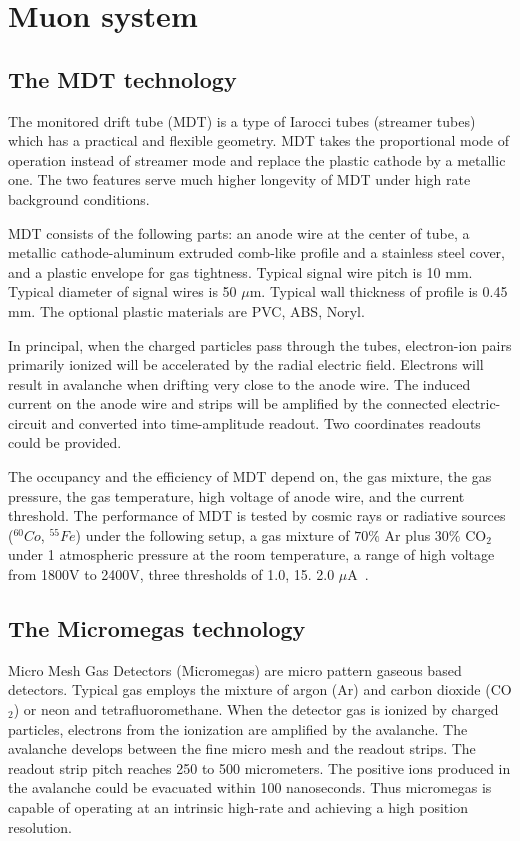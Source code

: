 \chapter{Muon system}
\label{Chapter:Muon}


\section{The MDT technology}
\label{section:Muon-mdt}

The monitored drift tube (MDT) is a type of Iarocci tubes (streamer tubes)~\cite{pub:mdt}
which has a practical and flexible geometry. MDT takes the proportional mode of operation instead of
streamer mode and replace the plastic cathode by a metallic one. The two features serve much higher
longevity of MDT under high rate background conditions.

MDT consists of the following parts: an anode wire at the center of tube,
a metallic cathode-aluminum extruded comb-like profile and a stainless steel cover,
and a plastic envelope for gas tightness.
Typical signal wire
pitch is 10 mm. Typical diameter of signal wires is 50 $\mu$m. Typical wall thickness of profile
is 0.45 mm. The optional plastic materials are PVC, ABS, Noryl.

In principal, when the charged particles pass through the tubes, electron-ion pairs primarily ionized
will be accelerated by the radial electric field. Electrons will result in avalanche when drifting very close to the anode wire.
The induced current on the anode wire and strips will be amplified by the connected electric-circuit
and converted into time-amplitude readout. Two coordinates readouts could be provided.

The occupancy and the efficiency of MDT depend on, the gas mixture, the gas pressure, the gas temperature,
high voltage of anode wire, and the current threshold. The performance of MDT is tested by cosmic rays or radiative sources ($^{60}Co$, $^{55}Fe$)
under the following setup, a gas mixture of $70\%$ Ar plus $30\%$ CO$_2$ under 1 atmospheric pressure at the room temperature,
a range of high voltage from 1800V to 2400V, three thresholds of 1.0, 15. 2.0 $\mu$A~\cite{pub:mdt_test}.


\section{The Micromegas technology}
\label{section:Muon-mgs}
Micro Mesh Gas Detectors (Micromegas) are micro pattern gaseous based detectors.
Typical gas employs the mixture of argon (Ar) and carbon dioxide (CO$_2$) or neon and tetrafluoromethane.
When the detector gas is ionized by charged particles, electrons from the ionization are amplified by the avalanche.
The avalanche develops between the fine micro mesh and the readout strips.
The readout strip pitch reaches 250 to 500 micrometers.
The positive ions produced in the avalanche could be evacuated within 100 nanoseconds.
Thus micromegas is capable of operating at an intrinsic high-rate and achieving a high position resolution.

